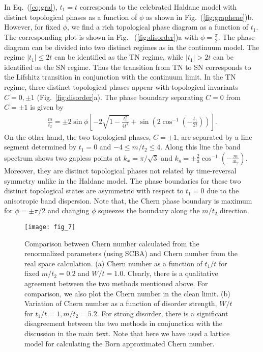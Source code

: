 \documentclass[aps,prb,showpacs,twocolumn,floats]{revtex4-1}
\begin{document}
In Eq.~(\ref{eq:gra}), $t_1=t$ corresponds to the celebrated Haldane model with distinct topological phases as a function of $\phi$ as shown in Fig.~(\ref{fig:graphene})b.  However, for fixed $\phi$, we find a rich topological phase diagram as a function of $t_1$. The corresponding plot is shown in Fig. ~(\ref{fig:disorder})a with $\phi = \frac{\pi}{2}$. The phase diagram can be divided into two distinct regimes as in the continuum model.  The regime $|t_1| \le2t $ can be identified as the TN regime, while $|t_1|>2t$ can be identified as the SN regime. Thus the transition from TN to SN corresponds to the Lifshitz transition in conjunction with the continuum limit. In the TN regime, three distinct topological phases appear with topological invariants $C=0,\pm1$ (Fig.~\ref{fig:disorder}a). The phase boundary separating $C=0$ from $C=\pm 1$ is given by
\begin{align}
\frac{m}{t_2}=\pm2\sin\phi\left[ -2 \sqrt{1-\frac{t_1^2}{4t^2}} + \sin\left(2\cos^{-1}\left(-\frac{t_1}{2t}\right)\right) \right].
\label{eq:phas}
\end{align}
On the other hand, the two topological phases, $C=\pm 1$, are separated by a line segment determined by $t_1=0$ and $-4\le m/t_2\le 4$. Along this line the band spectrum shows two gapless points at $k_x=\pi/\sqrt{3}$ and $k_y= \pm\frac{2}{3} \cos^{-1}(-\frac{m}{4 t_2})$. Moreover, they are distinct topological phases not related by time-reversal symmetry unlike in the Haldane model. The phase boundaries for these two distinct topological states are asymmetric with respect to $t_1=0$ due to the anisotropic band dispersion.  Note that, the Chern phase boundary is maximum for $\phi = \pm \pi/2$ and changing $\phi$ squeezes the boundary along the $m/t_2$ direction. 

\begin{figure}
\texttt{[image: fig\_7]}
\caption{Comparison between Chern number calculated from the renormalized parameters (using SCBA) and Chern number from the real space calculation.
(a) Chern number as a function of $t_1/t$ for fixed $m/t_2=0.2$ and $W/t=1.0$.  Clearly, there is a qualitative agreement between the two methods mentioned above. 
For comparison, we also plot the Chern number in the clean limit. (b) Variation of Chern number as a function of disorder strength, $W/t$ for $t_1/t = 1, m/t_2=5.2$. For strong disorder, there is a significant disagreement between the two methods in conjunction with the discussion in the main text.  Note that here we have used a lattice model for calculating the Born approximated Chern number.}
\label{fig:compare}
\end{figure}
\end{document}
